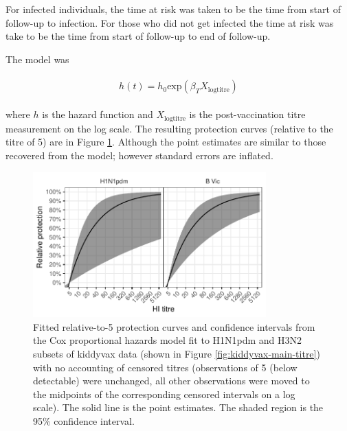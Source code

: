 For infected individuals, the time at risk was taken to be the time from start of follow-up to infection. For those who did not get infected the time at risk was take to be the time from start of follow-up to end of follow-up.

The model was

\begin{align*}
\begin{gathered}
h(t) = h_0\text{exp}(\beta_T X_{\text{logtitre}})
\end{gathered}
\end{align*}

where $h$ is the hazard function and $X_{\text{logtitre}}$ is the post-vaccination titre measurement on the log scale. The resulting protection curves (relative to the titre of 5) are in Figure \ref{fig:kiddyvaxmain-cox}. Although the point estimates are similar to those recovered from the model; however standard errors are inflated.

\begin{figure}[htp]
	\centering
	\includegraphics[width=0.8\textwidth]{../fit-cox-plot/kiddyvaxmain.pdf}
	\caption{
	Fitted relative-to-5 protection curves and confidence intervals from the Cox proportional hazards model fit to H1N1pdm and H3N2 subsets of kiddyvax data (shown in Figure \ref{fig:kiddyvax-main-titre}) with no accounting of censored titres (observations of 5 (below detectable) were unchanged, all other observations were moved to the midpoints of the corresponding censored intervals on a log scale). The solid line is the point estimates. The shaded region is the 95\% confidence interval.
	}
	\label{fig:kiddyvaxmain-cox}
\end{figure}
